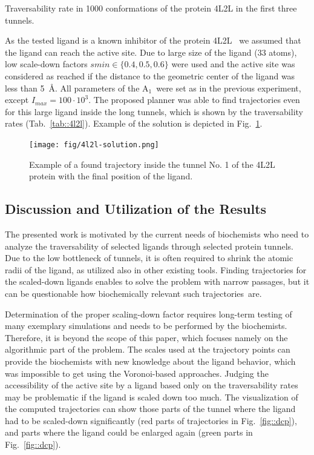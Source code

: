 \documentclass{bmcart}
\def\Imax{I_{max}} %
\def\RA{A$_{1}$}
\begin{document}
\begin{table}[bt]
\centering
\caption{\label{tab::4l2l}
    \small
    Traversability rate in 1000 conformations of the protein 4L2L in the first three tunnels.
}
\small
\renewcommand{\tabcolsep}{2pt}
{
\scriptsize
%
}
\end{table}

As the tested ligand is a known inhibitor of the protein 4L2L~\cite{marques2017enzyme} we assumed that the ligand can reach the active site.
Due to large size of the ligand (33 atoms), low scale-down factors $smin\in\{0.4,0.5,0.6\}$ were used and
the active site was considered as reached if the distance to the geometric center of the ligand was less than 5~\AA.
All parameters of the \RA\ were set as in the previous experiment, except $\Imax=100\cdot10^3$.
The proposed planner was able to find trajectories even for this large ligand inside the long tunnels, which is
shown by the traversability rates (Tab.~\ref{tab::4l2l}).
Example of the solution is depicted in Fig.~\ref{fig::inhibitor}.

\begin{figure}
\centering
\vskip -5pt
\texttt{[image: fig/4l2l-solution.png]}
\caption{\small
    \label{fig::inhibitor}Example of a found trajectory inside the tunnel No. 1 of the 4L2L protein with the final position of the ligand.
}
\end{figure}


\subsection*{Discussion and Utilization of the Results}
The presented work is motivated by the current needs of biochemists who need to analyze the traversability of selected ligands through selected protein tunnels.
Due to the low bottleneck of tunnels, it is often required to shrink the atomic radii of the ligand, as utilized also in other existing tools.
Finding trajectories for the scaled-down ligands enables to solve the problem with narrow passages, but it can be questionable how biochemically relevant such trajectories~are.

Determination of the proper scaling-down factor requires long-term testing of many exemplary simulations and needs to be performed by the biochemists. 
Therefore, it is beyond the scope of this paper, which focuses namely on the algorithmic part of the problem.
The scales used at the trajectory points can provide the biochemists with new knowledge about the ligand behavior, which was impossible to get using the Voronoi-based approaches.
Judging the accessibility of the active site by a ligand based only on the traversability rates may be problematic if the ligand is scaled down too much.
The visualization of the computed trajectories can show those parts of the tunnel where the ligand had to be scaled-down significantly (red parts of trajectories in Fig.~\ref{fig::dcp}), and parts where the ligand could be enlarged again (green parts in Fig.~\ref{fig::dcp}).
\end{document}
